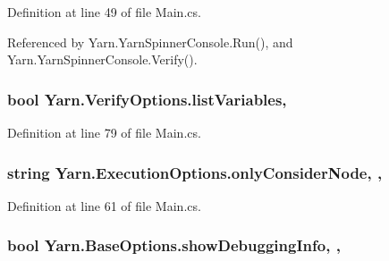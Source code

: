 Definition at line 49 of file Main.\-cs.



Referenced by Yarn.\-Yarn\-Spinner\-Console.\-Run(), and Yarn.\-Yarn\-Spinner\-Console.\-Verify().

\hypertarget{a00192_a062775744f2d7144527fa3bca4b9b3ce}{
\subsubsection[{list\-Variables}]{\setlength{\rightskip}{0pt plus 5cm}bool Yarn.\-Verify\-Options.\-list\-Variables\hspace{0.3cm}{\ttfamily [get]}, {\ttfamily [set]}}}\label{a00192_a062775744f2d7144527fa3bca4b9b3ce}


Definition at line 79 of file Main.\-cs.

\hypertarget{a00103_af4c0062a1d46281d377f87084fde374e}{
\subsubsection[{only\-Consider\-Node}]{\setlength{\rightskip}{0pt plus 5cm}string Yarn.\-Execution\-Options.\-only\-Consider\-Node\hspace{0.3cm}{\ttfamily [get]}, {\ttfamily [set]}, {\ttfamily [inherited]}}}\label{a00103_af4c0062a1d46281d377f87084fde374e}


Definition at line 61 of file Main.\-cs.

\hypertarget{a00041_a89964ea17bd19caf00cb5bff563ed01c}{
\subsubsection[{show\-Debugging\-Info}]{\setlength{\rightskip}{0pt plus 5cm}bool Yarn.\-Base\-Options.\-show\-Debugging\-Info\hspace{0.3cm}{\ttfamily [get]}, {\ttfamily [set]}, {\ttfamily [inherited]}}}\label{a00041_a89964ea17bd19caf00cb5bff563ed01c}


